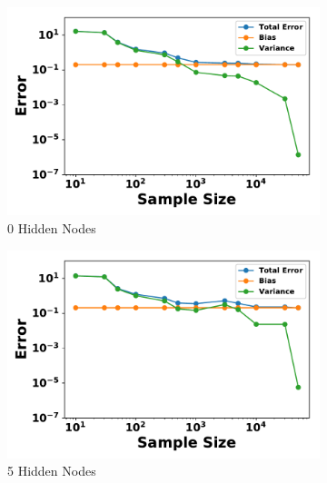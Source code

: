 \documentclass[letterpaper]{article} %
\begin{document}
        
        \begin{figure}[p]
          \centering
          \begin{subfigure}[b]{0.245\textwidth}
              \centering
              \includegraphics[width=\textwidth]{./RBM_Error_vs_Samples_HiddenNodes0-eps-converted-to.pdf}
              \caption{0 Hidden Nodes}
          \end{subfigure}
          \begin{subfigure}[b]{0.245\textwidth}
              \centering
              \includegraphics[width=\textwidth]{./RBM_Error_vs_Samples_HiddenNodes5-eps-converted-to.pdf}
              \caption{5 Hidden Nodes}
          \end{subfigure}
          \begin{subfigure}[b]{0.245\textwidth}
              \centering

\end{subfigure}
\end{figure}
\end{document}
